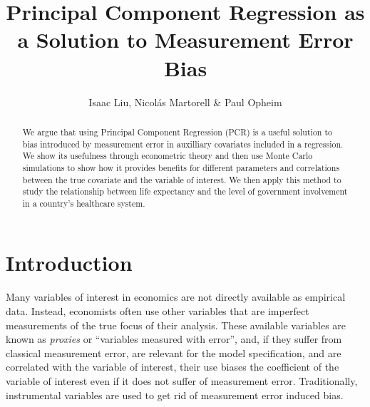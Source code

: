 \documentclass[10pt]{article}
\begin{document}
    \thispagestyle{firststyle}

    \author{Isaac Liu, Nicol\'as Martorell \& Paul Opheim}
    \title{Principal Component Regression as a Solution to Measurement Error Bias} 
    \maketitle



    \begin{abstract}

        We argue that using Principal Component Regression (PCR) is a useful solution to bias introduced by measurement error in auxilliary covariates included in a regression. We show its usefulness through econometric theory and then use Monte Carlo simulations to show how it provides benefits for different parameters and correlations between the true covariate and the variable of interest. We then apply this method to study the relationship between life expectancy and the level of government involvement in a country's healthcare system.
        
    \end{abstract}

    \newpage \clearpage

    \section*{Introduction}

        Many variables of interest in economics are not directly available as empirical data. Instead, economists often use other variables that are imperfect measurements of the true focus of their analysis. These available variables are known as \textit{proxies} or ``variables measured with error'', and, if they suffer from classical measurement error, are relevant for the model specification, and are correlated with the variable of interest, their use biases the coefficient of the variable of interest even if it does not suffer of measurement error. Traditionally, instrumental variables are used to get rid of measurement error induced bias.
\end{document}
